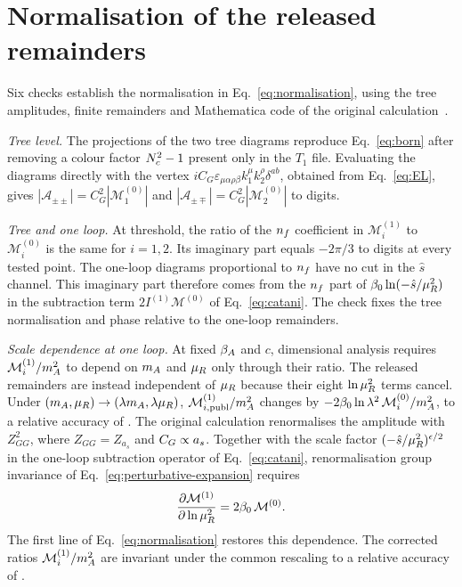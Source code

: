 \section{Normalisation of the released remainders}
\label{app:normalization}

Six checks establish the normalisation in Eq.~\eqref{eq:normalisation},
using the tree amplitudes, finite remainders and Mathematica code of
the original calculation~\cite{Bhattacharya:2019bmd}.

\emph{Tree level.}
The projections of the two tree diagrams reproduce Eq.~\eqref{eq:born}
after removing a colour factor $N_c^2-1$ present only in the $T_1$ file.
Evaluating the diagrams directly with the vertex
$iC_G\varepsilon_{\mu\alpha\rho\beta}k_1^\mu k_2^\rho\delta^{ab}$,
obtained from Eq.~\eqref{eq:EL}, gives
$|\mathcal A_{\pm\pm}|=C_G^2|\mathcal M_1^{(0)}|$ and
$|\mathcal A_{\pm\mp}|=C_G^2|\mathcal M_2^{(0)}|$
to \FeynmanDigits{} digits.

\emph{Tree and one loop.}
At threshold, the ratio of the $n_f$ coefficient in
$\mathcal M_i^{(1)}$ to $\mathcal M_i^{(0)}$ is the same for $i=1,2$.
Its imaginary part equals $-2\pi/3$ to \CataniImagDigits{} digits
at every tested point.
The one-loop diagrams proportional to $n_f$ have no cut in the
$\hat s$ channel. This imaginary part therefore comes from the
$n_f$ part of $\beta_0\ln(-\hat s/\mu_R^2)$ in the subtraction term
$2I^{(1)}\mathcal M^{(0)}$ of Eq.~\eqref{eq:catani}.
The check fixes the tree normalisation and phase relative to the
one-loop remainders.

\emph{Scale dependence at one loop.}
At fixed $\beta_A$ and $c$, dimensional analysis requires
$\mathcal M_i^{(1)}/m_A^2$ to depend on $m_A$ and $\mu_R$ only
through their ratio.
The released remainders are instead independent of $\mu_R$ because
their eight $\ln\mu_R^2$ terms cancel.
Under $(m_A,\mu_R)\to(\lambda m_A,\lambda\mu_R)$,
$\mathcal M_{i,\mathrm{publ}}^{(1)}/m_A^2$ changes by
$-2\beta_0\ln\lambda^2\,\mathcal M_i^{(0)}/m_A^2$,
to a relative accuracy of \ScalingRawDev{}.
The original calculation renormalises the amplitude with $Z_{GG}^2$,
where $Z_{GG}=Z_{a_s}$ and $C_G\propto a_s$.
Together with the scale factor
$(-\hat s/\mu_R^2)^{\epsilon/2}$ in the one-loop subtraction operator
of Eq.~\eqref{eq:catani}, renormalisation group invariance of
Eq.~\eqref{eq:perturbative-expansion} requires
\begin{equation}
 \frac{\partial\mathcal M^{(1)}}{\partial\ln\mu_R^2}
 =2\beta_0\,\mathcal M^{(0)} .
 \label{eq:rg-one}
\end{equation}
The first line of Eq.~\eqref{eq:normalisation} restores this dependence.
The corrected ratios $\mathcal M_i^{(1)}/m_A^2$ are invariant under
the common rescaling to a relative accuracy of \ScalingFixedDev{}.


